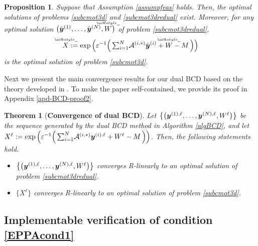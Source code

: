 \documentclass[10pt]{article}
\makeatletter
\def \widebar{\accentset{{\cc@style\underline{\mskip10mu}}}}
\newcommand{\cA}{{\cal A}}
\newtheorem{proposition}{Proposition}
\newtheorem{theorem}{Theorem}
\makeatother
\begin{document}
\begin{proposition}\label{existopt}
Suppose that Assumption \ref{assumpfeas} holds. Then, the optimal solutions of problems \eqref{subcmot3d} and \eqref{subcmot3dredual} exist. Moreover, for any optimal solution $\big(\bar{\bm{y}}^{(1)},\dots,\bar{\bm{y}}^{(N)},\widebar{W}\big{)}$ of problem \eqref{subcmot3dredual},
\begin{equation}\label{recprisol}
\widebar{X} := \exp\Big(\varepsilon^{-1} \Big(\, {\textstyle\sum_{i = 1}^N} \cA^{(i,*)}\bar{\bm{y}}^{(i)}+\widebar{W}-M\,\Big)\Big)
\end{equation}
is the optimal solution of problem \eqref{subcmot3d}.
\end{proposition}

Next we present the main convergence results for our dual BCD based on the
theory developed in \cite{lt1992convergence}. To make the paper self-contained, we provide its proof in Appendix \ref{apd-BCD-proof2}.

\begin{theorem}[\textbf{Convergence of dual BCD}]\label{thmBCD}
Let $\big{\{}\big{(}\bm{y}^{(1),\ell},\dots,\bm{y}^{(N),\ell},W^{\ell}\big{)}\big{\}}$ be the sequence generated by the dual BCD method in Algorithm \ref{algBCD}, and let $X^{\ell} := \exp\Big(\varepsilon^{-1} \Big(\,{\textstyle\sum_{i=1}^N}\cA^{(i,*)}\bm{y}^{(i),\ell}
+W^{\ell}-M\,\Big)\Big)$.
Then, the following statements hold.
\begin{itemize}
\item[{\rm (i)}] $\big{\{}\big{(}\bm{y}^{(1),\ell},\dots,\bm{y}^{(N),\ell},W^{\ell}\big{)}\big{\}}$ converges R-linearly to an optimal solution of problem \eqref{subcmot3dredual}.

\item[{\rm (ii)}] $\{X^{\ell}\}$ converges R-linearly to an optimal solution of problem \eqref{subcmot3d}.
\end{itemize}
\end{theorem}






\subsection{Implementable verification of condition \eqref{EPPAcond1}}\label{sec-verif}
\end{document}
